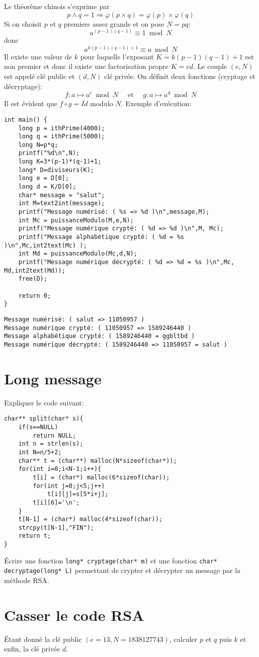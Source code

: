 \documentclass{article}
\begin{document}
 Le théorème chinois s'exprime par 
 \[p\wedge q=1 \Longrightarrow \varphi(p \times q)=\varphi(p) \times \varphi(q)\]
 Si on choisit $p$ et $q$  premiers assez grands et on pose $N=pq$:
 \[{\displaystyle a^{(p-1)(q-1)}\equiv 1{\bmod {N}}}\]
 donc
  \[{\displaystyle a^{k(p-1)(q-1)+1}\equiv a{\bmod {N}}}\]
  Il existe une valeur de $k$ pour laquelle l'exposant $K=k(p-1)(q-1)+1$ est non premier et donc il existe une factorisation propre $K=e d$. Le couple $(e,N)$ est appelé clé public et $(d,N)$ clé privée. On définit deux fonctions (cryptage et décryptage):
  \[f:a\mapsto a^e  {\bmod {N}}\quad \mbox{ et }\quad g:a\mapsto a^d  {\bmod {N}}\]
  Il est évident que $f\circ g =Id$ modulo $N$. Exemple d'exécution:
\begin{verbatim}
int main() {
    long p = ithPrime(4000);
    long q = ithPrime(5000);
    long N=p*q;
    printf("%d\n",N);
    long K=3*(p-1)*(q-1)+1;
    long* D=diviseurs(K);
    long e = D[0];
    long d = K/D[0];
    char* message = "salut";
    int M=text2int(message);
    printf("Message numérisé: ( %s => %d )\n",message,M);
    int Mc = puissanceModulo(M,e,N);
    printf("Message numérique crypté: ( %d => %d )\n",M, Mc);
    printf("Message alphabétique crypté: ( %d = %s )\n",Mc,int2text(Mc) );
    int Md = puissanceModulo(Mc,d,N);
    printf("Message numérique décrypté: ( %d => %d = %s )\n",Mc, Md,int2text(Md));
    free(D);
    
    return 0;
}    
\end{verbatim}
\begin{verbatim}
Message numérisé: ( salut => 11050957 )
Message numérique crypté: ( 11050957 => 1589246440 )
Message alphabétique crypté: ( 1589246440 = ggbltbd )
Message numérique décrypté: ( 1589246440 => 11050957 = salut )
\end{verbatim}
\section*{Long message}
Expliquer le code suivant:
\begin{verbatim}
char** split(char* s){
    if(s==NULL)
        return NULL;
    int n = strlen(s);
    int N=n/5+2;
    char** t = (char**) malloc(N*sizeof(char*));
    for(int i=0;i<N-1;i++){
        t[i] = (char*) malloc(6*sizeof(char));
        for(int j=0;j<5;j++)
            t[i][j]=s[5*i+j];
        t[i][6]='\n';
    }
    t[N-1] = (char*) malloc(4*sizeof(char));
    strcpy(t[N-1],"FIN");
    return t;
}
\end{verbatim}
Écrire une fonction {\tt long* cryptage(char* m)} et une fonction {\tt char* decryptage(long* L)} permettant de crypter et décrypter un message par la méthode RSA.
\section*{Casser le code RSA}
Étant donné la clé public $(e=13,N=1838127743)$, calculer $p$ et $q$ puis $k$ et enfin, la clé privée $d$.
\end{document}
